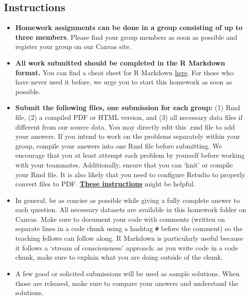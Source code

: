 \documentclass[
]{article}
\begin{document}
\hypertarget{instructions}{%
\subsection{Instructions}\label{instructions}}

\begin{itemize}
\item
  \textbf{Homework assignments can be done in a group consisting of up
  to three members}. Please find your group members as soon as possible
  and register your group on our Canvas site.
\item
  \textbf{All work submitted should be completed in the R Markdown
  format.} You can find a cheat sheet for R Markdown
  \href{https://github.com/rstudio/cheatsheets/raw/master/rmarkdown-2.0.pdf}{here}.
  For those who have never used it before, we urge you to start this
  homework as soon as possible.
\item
  \textbf{Submit the following files, one submission for each group:}
  (1) Rmd file, (2) a compiled PDF or HTML version, and (3) all
  necessary data files if different from our source data. You may
  directly edit this .rmd file to add your answers. If you intend to
  work on the problems separately within your group, compile your
  answers into one Rmd file before submitting. We encourage that you at
  least attempt each problem by yourself before working with your
  teammates. Additionally, ensure that you can `knit' or compile your
  Rmd file. It is also likely that you need to configure Rstudio to
  properly convert files to PDF.
  \href{http://kbroman.org/knitr_knutshell/pages/latex.html\#converting-knitrlatex-to-pdf}{\textbf{These
  instructions}} might be helpful.
\item
  In general, be as concise as possible while giving a fully complete
  answer to each question. All necessary datasets are available in this
  homework folder on Canvas. Make sure to document your code with
  comments (written on separate lines in a code chunk using a hashtag
  \texttt{\#} before the comment) so the teaching fellows can follow
  along. R Markdown is particularly useful because it follows a `stream
  of consciousness' approach: as you write code in a code chunk, make
  sure to explain what you are doing outside of the chunk.
\item
  A few good or solicited submissions will be used as sample solutions.
  When those are released, make sure to compare your answers and
  understand the solutions.
\end{itemize}
\end{document}
